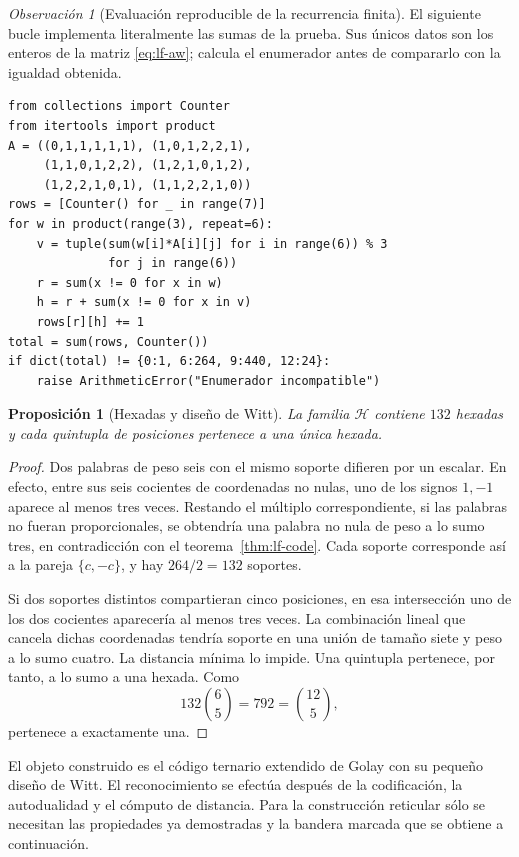 \documentclass[a4paper,10pt]{article}
\newtheorem{proposition}[theorem]{Proposición}
\theoremstyle{definition}\newtheorem{definition}[theorem]{Definición}
\theoremstyle{remark}\newtheorem{remark}[theorem]{Observación}
\numberwithin{equation}{section}
\begin{document}
\begin{remark}[Evaluación reproducible de la recurrencia finita]
El siguiente bucle implementa literalmente las sumas de la prueba.
Sus únicos datos son los enteros de la matriz
\eqref{eq:lf-aw}; calcula el enumerador antes de compararlo con
la igualdad obtenida.
\end{remark}
{\small
\begin{verbatim}
from collections import Counter
from itertools import product
A = ((0,1,1,1,1,1), (1,0,1,2,2,1),
     (1,1,0,1,2,2), (1,2,1,0,1,2),
     (1,2,2,1,0,1), (1,1,2,2,1,0))
rows = [Counter() for _ in range(7)]
for w in product(range(3), repeat=6):
    v = tuple(sum(w[i]*A[i][j] for i in range(6)) % 3
              for j in range(6))
    r = sum(x != 0 for x in w)
    h = r + sum(x != 0 for x in v)
    rows[r][h] += 1
total = sum(rows, Counter())
if dict(total) != {0:1, 6:264, 9:440, 12:24}:
    raise ArithmeticError("Enumerador incompatible")
\end{verbatim}
}

\begin{proposition}[Hexadas y diseño de Witt]
\label{prop:lf-witt}
La familia \(\mathcal H\) contiene \(132\) hexadas y cada
quintupla de posiciones pertenece a una única hexada.
\end{proposition}
\begin{proof}
Dos palabras de peso seis con el mismo soporte difieren por
un escalar. En efecto, entre sus seis cocientes de coordenadas
no nulas, uno de los signos \(1,-1\) aparece al menos tres
veces. Restando el múltiplo correspondiente, si las palabras
no fueran proporcionales, se obtendría una palabra no nula
de peso a lo sumo tres, en contradicción con
el teorema~\ref{thm:lf-code}. Cada soporte corresponde así a
la pareja \(\{c,-c\}\), y hay \(264/2=132\) soportes.

Si dos soportes distintos compartieran cinco posiciones,
en esa intersección uno de los dos cocientes aparecería al
menos tres veces. La combinación lineal que cancela dichas
coordenadas tendría soporte en una unión de tamaño siete
y peso a lo sumo cuatro. La distancia mínima lo impide.
Una quintupla pertenece, por tanto, a lo sumo a una hexada.
Como
\[
 132\binom65=792=\binom{12}{5},
\]
pertenece a exactamente una.
\end{proof}

El objeto construido es el código ternario extendido de Golay
con su pequeño diseño de Witt. El reconocimiento se efectúa
después de la codificación, la autodualidad y el cómputo de
distancia. Para la construcción reticular sólo se necesitan
las propiedades ya demostradas y la bandera marcada que se
obtiene a continuación.
\end{document}
